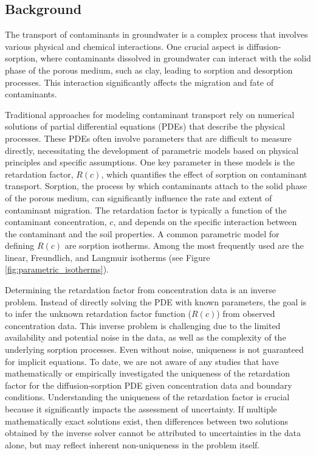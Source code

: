 \subsection{Background}
The transport of contaminants in groundwater is a complex process that involves various physical and chemical interactions. One crucial aspect is diffusion-sorption, where contaminants dissolved in groundwater can interact with the solid phase of the porous medium, such as clay, leading to sorption and desorption processes. This interaction significantly affects the migration and fate of contaminants.

Traditional approaches for modeling contaminant transport rely on numerical solutions of partial differential equations (PDEs) that describe the physical processes. These PDEs often involve parameters that are difficult to measure directly, necessitating the development of parametric models based on physical principles and specific assumptions.
One key parameter in these models is the retardation factor, $R(c)$, which quantifies the effect of sorption on contaminant transport. Sorption, the process by which contaminants attach to the solid phase of the porous medium, can significantly influence the rate and extent of contaminant migration. The retardation factor is typically a function of the contaminant concentration, $c$, and depends on the specific interaction between the contaminant and the soil properties.
A common parametric model for defining $R(c)$ are sorption isotherms. Among the most frequently used are the linear, Freundlich, and Langmuir isotherms \cite{finn} (see Figure \vref{fig:parametric_isotherms}).

Determining the retardation factor from concentration data is an inverse problem. Instead of directly solving the PDE with known parameters, the goal is to infer the unknown retardation factor function ($R(c)$) from observed concentration data. This inverse problem is challenging due to the limited availability and potential noise in the data, as well as the complexity of the underlying sorption processes. Even without noise, uniqueness is not guaranteed for implicit equations. To date, we are not aware of any studies that have mathematically or empirically investigated the uniqueness of the retardation factor for the diffusion-sorption PDE given concentration data and boundary conditions. Understanding the uniqueness of the retardation factor is crucial because it significantly impacts the assessment of uncertainty. If multiple mathematically exact solutions exist, then differences between two solutions obtained by the inverse solver cannot be attributed to uncertainties in the data alone, but may reflect inherent non-uniqueness in the problem itself.


